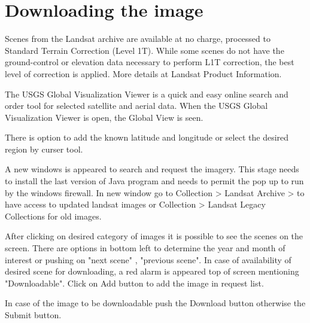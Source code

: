 \section{Downloading the image}
Scenes from the Landsat archive are available at no charge, processed to Standard Terrain Correction (Level 1T). While some scenes do not have the ground-control or elevation data necessary to perform L1T correction, the best level of correction is applied. More details at Landsat Product Information.\newline

The USGS Global Visualization Viewer is a quick and easy online search and order tool for selected satellite and aerial data. When the USGS Global Visualization Viewer is open, the Global View is seen.\newline

There is option to add the known latitude and longitude or select the desired region by curser tool.\newline

A new windows is appeared to search and request the imagery. This stage needs to install the last version of Java program and needs to permit the pop up to run by the windows firewall.
In new window go to Collection > Landsat Archive > to have access to updated landsat images or Collection > Landsat Legacy Collections for old images.\newline

After clicking on desired  category of  images it is possible to see the scenes on the screen. There are options in bottom left to determine the year and month of interest or pushing on "next scene" , "previous scene". In case of availability of desired scene for downloading, a red alarm is appeared top of screen mentioning "Downloadable".  Click on Add button to add the image in request list.\newline

In case of the image to be downloadable push the Download button otherwise the Submit button.\newline  

